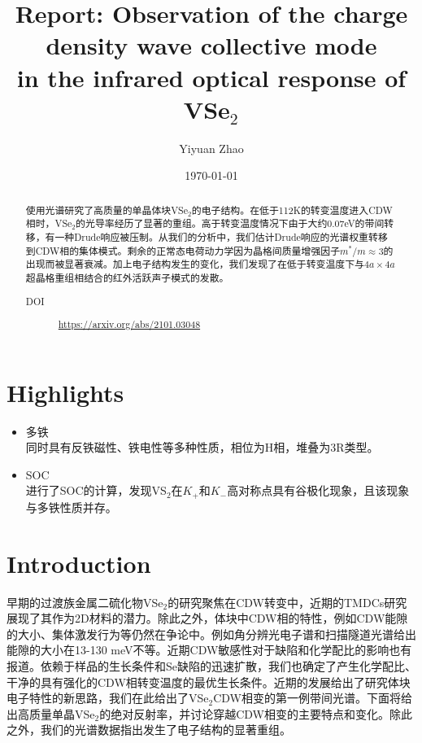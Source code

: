 \documentclass[reprint, aps, prb, showkeys]{revtex4-2}
\begin{document}
\title{Report: Observation of the charge density wave collective mode\\
in the infrared optical response of VSe$_2$}

\author{Yiyuan Zhao}
\date{\today}

\begin{abstract}
使用光谱研究了高质量的单晶体块VSe$_2$的电子结构。在低于112K的转变温度进入CDW相时，VSe$_2$的光导率经历了显著的重组。高于转变温度情况下由于大约0.07eV的带间转移，有一种Drude响应被压制。从我们的分析中，我们估计Drude响应的光谱权重转移到CDW相的集体模式。剩余的正常态电荷动力学因为晶格间质量增强因子$m^{*}/m \approx 3$的出现而被显著衰减。加上电子结构发生的变化，我们发现了在低于转变温度下与$4a \times 4a$超晶格重组相结合的红外活跃声子模式的发散。
\begin{description}
    \item[DOI] \url{https://arxiv.org/abs/2101.03048}
\end{description}
\end{abstract}


\maketitle
\section{Highlights}
\begin{itemize}
    \item 多铁 \\
    同时具有反铁磁性、铁电性等多种性质，相位为H相，堆叠为3R类型。
    \item SOC \\
    进行了SOC的计算，发现VS$_2$在$K_{+}$和$K_{-}$高对称点具有谷极化现象，且该现象与多铁性质并存。
\end{itemize}

\section{Introduction}
早期的过渡族金属二硫化物VSe$_2$的研究聚焦在CDW转变中，近期的TMDCs研究展现了其作为2D材料的潜力。除此之外，体块中CDW相的特性，例如CDW能隙的大小、集体激发行为等仍然在争论中。例如角分辨光电子谱和扫描隧道光谱给出能隙的大小在13-130 meV不等。近期CDW敏感性对于缺陷和化学配比的影响也有报道。依赖于样品的生长条件和Se缺陷的迅速扩散，我们也确定了产生化学配比、干净的具有强化的CDW相转变温度的最优生长条件。近期的发展给出了研究体块电子特性的新思路，我们在此给出了VSe$_2$CDW相变的第一例带间光谱。下面将给出高质量单晶VSe$_2$的绝对反射率，并讨论穿越CDW相变的主要特点和变化。除此之外，我们的光谱数据指出发生了电子结构的显著重组。
\end{document}
